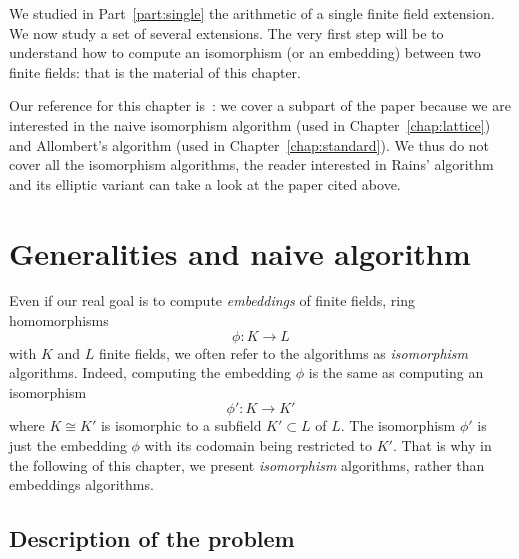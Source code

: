 We studied in Part~\ref{part:single} the arithmetic of a single finite field
extension. We now study a set of several extensions. The very first step will be
to understand how to compute an isomorphism (or an embedding) between two finite
fields: that is the material of this chapter.
\minitoc


\clearpage

Our reference for this chapter is~\cite{BDDFS17}: we cover a subpart of the
paper because we are interested in the naive isomorphism algorithm (used in
Chapter~\ref{chap:lattice}) and Allombert's algorithm (used in
Chapter~\ref{chap:standard}). We thus do not cover all the isomorphism
algorithms, the reader interested in Rains' algorithm and its elliptic variant
can take a look at the paper cited above.

\section{Generalities and naive algorithm}

Even if our real goal is to compute \emph{embeddings} of finite fields, \ie
ring homomorphisms
\[
  \phi:K\to L
\]
with $K$ and $L$ finite fields, we often refer to the algorithms as
\emph{isomorphism} algorithms. Indeed, computing the embedding $\phi$ is
the same as computing an isomorphism
\[
  \phi':K\to K'
\]
where $K\cong K'$ is isomorphic to a subfield $K'\subset L$ of $L$. The
isomorphism $\phi'$ is just the embedding $\phi$ with its codomain being
restricted to $K'$. That is why in the following of this chapter, we present
\emph{isomorphism} algorithms, rather than embeddings algorithms.

\subsection{Description of the problem}


